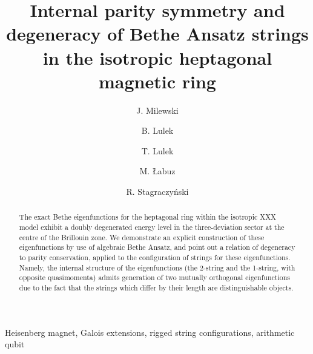 \documentclass{elsarticle}
\begin{document}
\begin{frontmatter}

\title{Internal parity symmetry and degeneracy of Bethe Ansatz strings in the isotropic heptagonal magnetic ring}%
\author[jm]{J. Milewski}
\author[bl]{B. Lulek}
\author[tlp,bl]{T. Lulek}
\author[ml]{M. \L{}abuz}
\author[rs]{R. Stagraczy\'nski}
\address[jm]{Institute of Mathematics, Pozna\'n University of Technology, \\Piotrowo 3A, 60-965 Pozna\'n, Poland}
\address[bl]{East European State Higher School, ul. Tymona Terleckiego 6, 37-700 Przemy\'sl, Poland}
\address[tlp]{Faculty of Physics, Adam Mickiewicz University, \\Umultowska 85, 61-614 Pozna\'n, Poland}
\address[ml]{University of Rzeszow, Institute of Physics, Rejtana 16a, 35-959 Rzesz\'ow, Poland}
\address[rs]{Rzeszow University of Technology, The Faculty of Mathematics and Applied Physics, Powsta\'nc\'ow Warszawy 6, 35-959 Rzesz\'ow, Poland}


\begin{abstract}
The exact Bethe eigenfunctions for the heptagonal ring within the isotropic XXX model exhibit a doubly degenerated energy level in the three-deviation sector at the centre of the Brillouin zone. We demonstrate an explicit construction of these eigenfunctions by use of algebraic Bethe Ansatz, and point out a relation of degeneracy to parity conservation, applied to the configuration of strings for these eigenfunctions. Namely, the internal structure of the eigenfunctions (the 2-string and the 1-string, with opposite quasimomenta) admits generation of two mutually orthogonal eigenfunctions due to the fact that the strings which differ by their length are distinguishable objects.
\end{abstract}

\begin{keyword}
Heisenberg magnet, Galois extensions, rigged string configurations, arithmetic qubit
\end{keyword}

\end{frontmatter}
\end{document}
